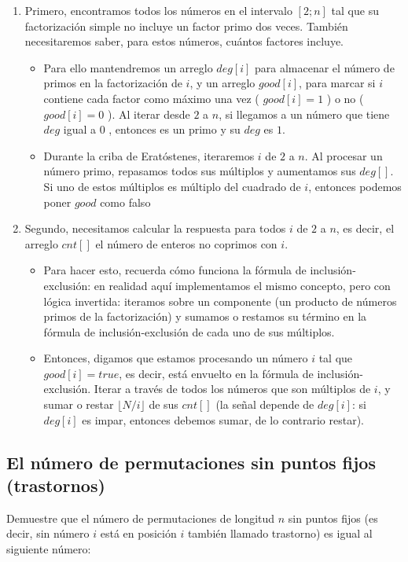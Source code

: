 \begin{enumerate}
	\item Primero, encontramos todos los números en el intervalo $[2;n]$ tal que su factorización simple no incluye un factor primo dos veces. También necesitaremos saber, para estos números, cuántos factores incluye.
	
	\begin{itemize}
		\item Para ello mantendremos un arreglo $deg[i]$ para almacenar el número de primos en la  
		factorización de $i$, y un arreglo $good[i]$, para marcar si $i$ contiene cada factor como 
		máximo una vez ( $good[i] = 1$ ) o no ( $good[i] = 0$ ). Al iterar desde $2$ a $n$, si llegamos 
		a un número que tiene $deg$ igual a $0$ , entonces es un primo y su $deg$ es $1$.
		\item Durante la criba de Eratóstenes, iteraremos $i$ de $2$ a $n$. Al procesar un número 
		primo, repasamos todos sus múltiplos y aumentamos sus $deg[]$. Si uno de estos múltiplos es 
		múltiplo del cuadrado de $i$, entonces podemos poner $good$ como falso
	\end{itemize}
	
	\item Segundo, necesitamos calcular la respuesta para todos $i$ de $2$ a $n$, es decir, el arreglo $cnt[]$ el número de enteros no coprimos con $i$.
	\begin{itemize}
		\item Para hacer esto, recuerda cómo funciona la fórmula de inclusión-exclusión: en realidad aquí implementamos el mismo concepto, pero con lógica invertida: iteramos sobre un componente (un producto de números primos de la factorización) y sumamos o restamos su término en la fórmula de inclusión-exclusión de cada uno de sus múltiplos.
		\item Entonces, digamos que estamos procesando un número $i$ tal que $good[i] = true$,
		es decir, está envuelto en la fórmula de inclusión-exclusión. Iterar a través de todos los 
		números que son múltiplos de $i$, y sumar o restar $\lfloor N/i \rfloor$ de sus $cnt[]$ (la 
		señal depende de $deg[i]$: si $deg[i]$ es impar, entonces debemos sumar, de lo contrario 
		restar).
	\end{itemize}
\end{enumerate}

\subsection{El número de permutaciones sin puntos fijos (trastornos)}
Demuestre que el número de permutaciones de longitud $n$ sin puntos fijos (es decir, sin número $i$ está en posición $i$ también llamado trastorno) es igual al siguiente número:

